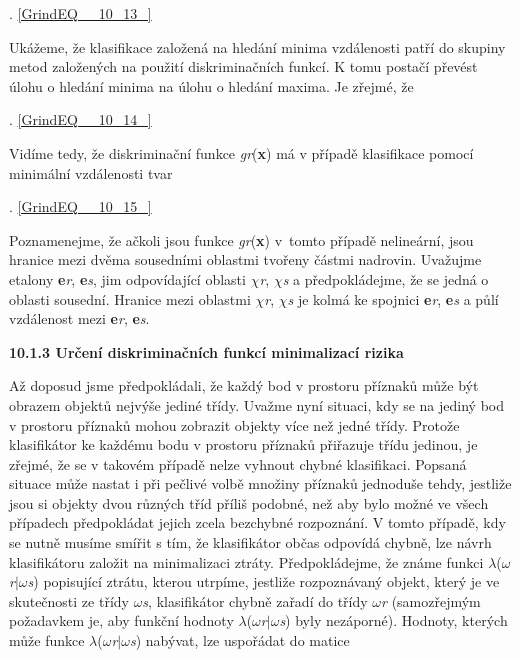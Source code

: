  . \eqref{GrindEQ__10_13_}

\noindent Ukážeme, že klasifikace založená na hledání minima vzdálenosti patří do skupiny metod založených na použití diskriminačních funkcí. K tomu postačí převést úlohu o hledání minima na úlohu o hledání maxima. Je zřejmé, že

 . \eqref{GrindEQ__10_14_}

\noindent Vidíme tedy, že diskriminační funkce \textit{gr}(\textbf{x}) má v případě klasifikace pomocí minimální vzdálenosti tvar 

 . \eqref{GrindEQ__10_15_}

\noindent Poznamenejme, že ačkoli jsou funkce \textit{gr}(\textbf{x}) v~tomto případě nelineární, jsou hranice mezi dvěma sousedními oblastmi tvořeny částmi nadrovin. Uvažujme etalony \textbf{e}\textit{r}, \textbf{e}\textit{s}, jim odpovídající oblasti $\chi$\textit{r}, $\chi$\textit{s} a předpokládejme, že se jedná o oblasti sousední. Hranice mezi oblastmi $\chi$\textit{r}, $\chi$\textit{s} je kolmá ke spojnici \textbf{e}\textit{r}, \textbf{e}\textit{s} a půlí vzdálenost mezi \textbf{e}\textit{r}, \textbf{e}\textit{s}.

\noindent \textbf{10.1.3 Určení diskriminačních funkcí minimalizací rizika}

\noindent Až doposud jsme předpokládali, že každý bod v prostoru příznaků může být obrazem objektů nejvýše jediné třídy. Uvažme nyní situaci, kdy se na jediný bod v prostoru příznaků mohou zobrazit objekty více než jedné třídy. Protože klasifikátor ke každému bodu v prostoru příznaků přiřazuje třídu jedinou, je zřejmé, že se v takovém případě nelze vyhnout chybné klasifikaci. Popsaná situace může nastat i při pečlivé volbě množiny příznaků jednoduše tehdy, jestliže jsou si objekty dvou různých tříd příliš podobné, než aby bylo možné ve všech případech předpokládat jejich zcela bezchybné rozpoznání. V tomto případě, kdy se nutně musíme smířit s tím, že klasifikátor občas odpovídá chybně, lze návrh klasifikátoru založit na minimalizaci ztráty. Předpokládejme, že známe funkci $\lambda$($\omega$\textit{r}$\mid$$\omega$\textit{s}) popisující ztrátu, kterou utrpíme, jestliže rozpoznávaný objekt, který je ve skutečnosti ze třídy $\omega$\textit{s}, klasifikátor chybně zařadí do třídy $\omega$\textit{r} (samozřejmým požadavkem je, aby funkční hodnoty $\lambda$($\omega$\textit{r}$\mid$$\omega$\textit{s}) byly nezáporné). Hodnoty, kterých může funkce $\lambda$($\omega$\textit{r}$\mid$$\omega$\textit{s}) nabývat, lze uspořádat do matice


